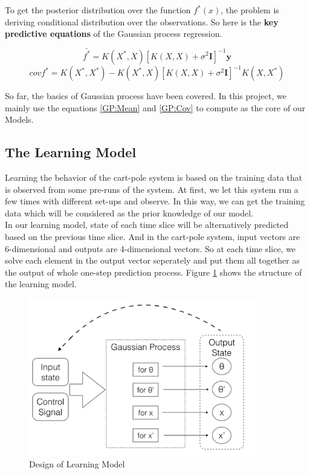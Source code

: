 \documentclass[11pt,twoside,a4paper]{article}
\begin{document}
To get the posterior distribution over the function $f^*(x)$, the
problem is deriving conditional distribution over the observations. So
here is the \textbf{key predictive equations} of the Gaussian process
regression.
\begin{center}
\begin{equation} \label{GP:Mean}
\bar{f^*} = K(X^*, X)[K(X, X) + \sigma^2\textbf{I}]^{-1}\textbf{y}
\end{equation}
\begin{equation} \label{GP:Cov}
cov{f^*} = K(X^*, X^*) - K(X^*, X)[K(X, X) +
\sigma^2\textbf{I}]^{-1}K(X, X^*)
\end{equation}
\end{center}
So far, the basics of Gaussian process have been covered. In this
project, we mainly use the equations \ref{GP:Mean} and \ref{GP:Cov} to
compute as the core of our Models.

\subsection{The Learning Model}
Learning the behavior of the cart-pole system is based on the
training data that is observed from some pre-runs of the system. At
first, we let this system run a few times with different
set-ups and observe. In this way, we can get the training data which
will be considered as the prior knowledge of our model.\\ 

In our learning model, state of each time slice will be alternatively
predicted based on the previous time slice. And in the cart-pole
system, input vectors are 6-dimensional and outputs are 4-dimensional
vectors. So at each time slice, we solve each element in
the output vector seperately and put them all together as the
output of whole one-step prediction process. Figure
\ref{learning-model} shows the structure of the learning model.\\

\begin{figure}[!]
\begin{center}
\includegraphics[width=10cm]{learning-model.png}
\caption{Design of Learning Model}
\label{learning-model}
\end{center}
\end{figure}
\end{document}
